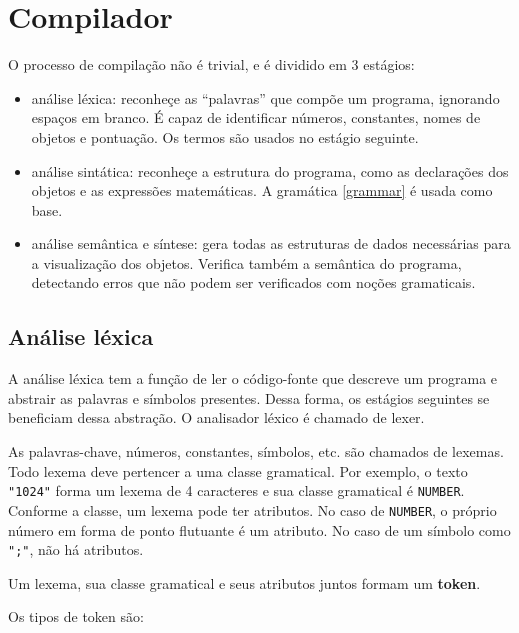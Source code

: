 \chapter{Compilador}
\label{comp}

O processo de compilação não é trivial, e é dividido em 3 estágios:
\begin{itemize}
    \item análise léxica: reconheçe as ``palavras'' que compõe um programa,
    ignorando espaços em branco. É capaz de identificar números, 
    constantes, nomes de objetos e pontuação.
    Os termos são usados no estágio seguinte.

    \item análise sintática: reconheçe a estrutura do programa, como
    as declarações dos objetos e as expressões matemáticas.
    A gramática \ref{grammar} é usada como base.

    \item análise semântica e síntese: gera todas as estruturas de dados
    necessárias para a visualização dos objetos.
    Verifica também a semântica do programa,
    detectando erros que não podem ser verificados com noções gramaticais.
\end{itemize}

\section{Análise léxica}
A análise léxica tem a função de ler o código-fonte que descreve um programa
e abstrair as palavras e símbolos presentes.
Dessa forma, os estágios seguintes se beneficiam dessa abstração.
O analisador léxico é chamado de lexer.

As palavras-chave, números, constantes, símbolos, etc. são chamados de lexemas.
Todo lexema deve pertencer a uma classe gramatical.
Por exemplo, o texto \texttt{"1024"} forma um lexema de 4 caracteres
e sua classe gramatical é \texttt{NUMBER}.
Conforme a classe, um lexema pode ter atributos.
No caso de \texttt{NUMBER}, o próprio número em forma de ponto flutuante é um atributo.
No caso de um símbolo como \texttt{";"}, não há atributos.

Um lexema, sua classe gramatical e seus atributos juntos formam um \textbf{token}.

Os tipos de token são:

